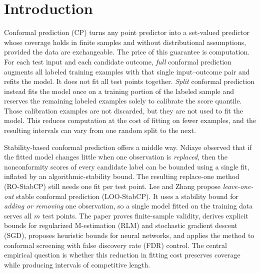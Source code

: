 \setlength{\emergencystretch}{2em}
\graphicspath{{../figures/}}
\newcommand{\LOO}{LOO-StabCP}
\newcommand{\RO}{RO-StabCP}
\makeatletter\newcommand{\inputtable}[1]{\@@input #1 }\makeatother

\section{Introduction}

Conformal prediction (CP) turns any point predictor into a set-valued predictor whose coverage holds in finite
samples and without distributional assumptions, provided the data are exchangeable\supercite{vovk2005algorithmic}.
The price of this guarantee is computation. For each test input and each candidate outcome, \emph{full} conformal prediction augments all labeled training examples with that single input--outcome pair and refits the model. It does not fit all test points together. \emph{Split} conformal prediction\supercite{papadopoulos2002inductive,lei2018distribution} instead fits the model once on a training portion of the labeled sample and reserves the remaining labeled examples solely to calibrate the score quantile. Those calibration examples are not discarded, but they are not used to fit the model. This reduces computation at the cost of fitting on fewer examples, and the resulting intervals can vary from one random split to the next.

Stability-based conformal prediction offers a middle way. Ndiaye\supercite{ndiaye2022stable} observed that if the
fitted model changes little when one observation is \emph{replaced}, then the nonconformity scores of every
candidate label can be bounded using a single fit, inflated by an algorithmic-stability bound. The resulting
replace-one method (\RO) still needs one fit per test point. Lee and Zhang\supercite{lee2025loo} propose
\emph{leave-one-out} stable conformal prediction (\LOO). It uses a stability bound for \emph{adding or removing} one
observation, so a single model fitted on the training data serves all $m$ test points. The paper proves finite-sample
validity, derives explicit bounds for regularized M-estimation (RLM) and stochastic gradient descent (SGD), proposes
heuristic bounds for neural networks, and applies the method to conformal screening with false discovery rate (FDR)
control. The central empirical question is whether this reduction in fitting cost preserves coverage while producing intervals of competitive length.

